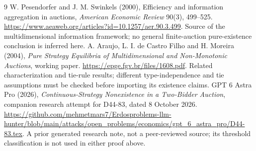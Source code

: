 \documentclass[11pt]{article}
\theoremstyle{definition}
\theoremstyle{remark}
\begin{document}
\begin{thebibliography}{9}
 W. Pesendorfer and J. M. Swinkels (2000), Efficiency and information aggregation in auctions, \emph{American Economic Review} 90(3), 499--525. \url{https://www.aeaweb.org/articles?id=10.1257/aer.90.3.499}. Source of the multidimensional information framework; no general finite-auction pure-existence conclusion is inferred here.
 A. Araujo, L. I. de Castro Filho and H. Moreira (2004), \emph{Pure Strategy Equilibria of Multidimensional and Non-Monotonic Auctions}, working paper. \url{https://epge.fgv.br/files/1608.pdf}. Related characterization and tie-rule results; different type-independence and tie assumptions must be checked before importing its existence claims.
 GPT 6 Astra Pro (2026), \emph{Continuous-Strategy Nonexistence in a Two-Bidder Auction}, companion research attempt for D44-83, dated 8 October 2026. \url{https://github.com/mehmetmars7/Erdosproblems-llm-hunter/blob/main/attacks/open_problems/economics/gpt_6_astra_pro/D44-83.tex}. A prior generated research note, not a peer-reviewed source; its threshold classification is not used in either proof above.
\end{thebibliography}
\end{document}
